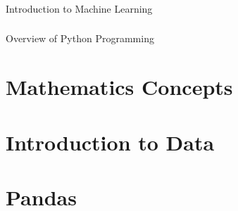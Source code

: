 



 \begin{frame}[fragile]\frametitle{}
 \begin{center}
 {\Large Introduction to Machine Learning}
 \end{center}
 \end{frame}
 
 
 
 

 \begin{frame}[fragile]\frametitle{}
 \begin{center}
 {\Large Overview of Python Programming}
 \end{center}
 \end{frame}





 \section[Maths]{Mathematics Concepts}
 
 
 
 
 
 
 

 


 

 
 
 
 \section[DataIntro]{Introduction to Data}
 
 

 \section[Pandas]{Pandas}
 

